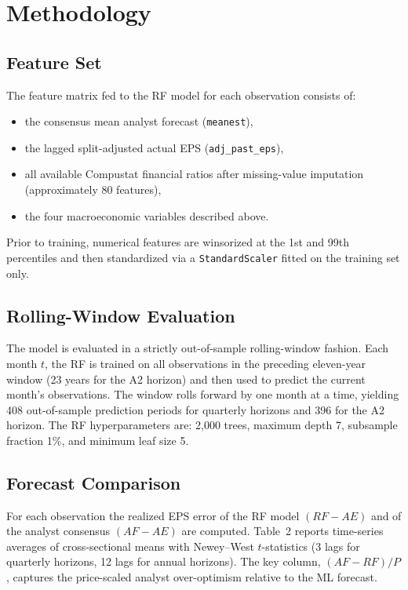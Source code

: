 \documentclass[12pt]{article}
\begin{document}
\section{Methodology}

\subsection{Feature Set}

The feature matrix fed to the RF model for each observation consists of:
\begin{itemize}
  \item the consensus mean analyst forecast (\texttt{meanest}),
  \item the lagged split-adjusted actual EPS (\texttt{adj\_past\_eps}),
  \item all available Compustat financial ratios after missing-value
        imputation (approximately 80 features),
  \item the four macroeconomic variables described above.
\end{itemize}
Prior to training, numerical features are winsorized at the 1st and 99th
percentiles and then standardized via a \texttt{StandardScaler} fitted on the
training set only.

\subsection{Rolling-Window Evaluation}

The model is evaluated in a strictly out-of-sample rolling-window fashion.
Each month $t$, the RF is trained on all observations in the preceding
eleven-year window (23 years for the A2 horizon) and then used to predict
the current month's observations.  The window rolls forward by one month at
a time, yielding 408 out-of-sample prediction periods for quarterly horizons
and 396 for the A2 horizon.  The RF hyperparameters are: 2{,}000 trees,
maximum depth 7, subsample fraction 1\%, and minimum leaf size 5.

\subsection{Forecast Comparison}

For each observation the realized EPS error of the RF model
$(RF - AE)$ and of the analyst consensus $(AF - AE)$ are computed.  Table~2
reports time-series averages of cross-sectional means with Newey--West
$t$-statistics (3 lags for quarterly horizons, 12 lags for annual horizons).
The key column, $(AF-RF)/P$, captures the price-scaled analyst over-optimism
relative to the ML forecast.
\end{document}
